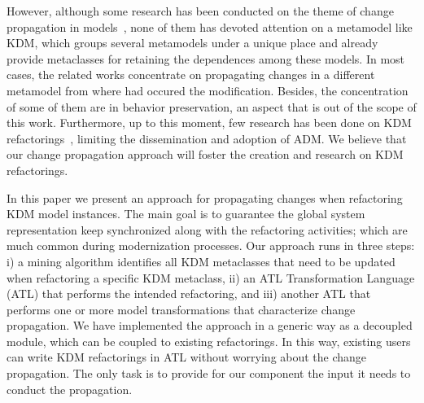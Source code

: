 However, although some research has been conducted on the theme of change propagation in models~\cite{4440135, Mens:2006:TMT:1706639.1706924, Mens:2006_NEW, Mens:2007, ICSOFT2014_Winetzhammer}, none of them has devoted attention on a metamodel like KDM, which groups several metamodels under a unique place and already provide metaclasses for retaining the dependences among these models. In most cases, the related works concentrate on propagating changes in a different metamodel from where had occured the modification. Besides, the concentration of some of them are in behavior preservation, an aspect that is out of the scope of this work. Furthermore, up to this moment, few research has been done on KDM refactorings~\cite{IRIDurelliCatalogo}, limiting the dissemination and adoption of ADM. We believe that our change propagation approach will foster the creation and research on KDM refactorings. 


In this paper we present an approach for propagating changes when refactoring KDM model instances. The main goal is to guarantee the global system representation keep synchronized along with the refactoring activities; which are much common during modernization processes. Our approach runs in three steps: i) a mining algorithm identifies all KDM metaclasses that need to be updated when refactoring a specific KDM metaclass, ii) an ATL Transformation Language (ATL) that performs the intended refactoring, and iii) another ATL that performs one or more model transformations that characterize change propagation. We have implemented the approach in a generic way as a decoupled module, which can be coupled to existing refactorings. In this way, existing users can write KDM refactorings in ATL without worrying about the change propagation. The only task is to provide for our component the input it needs to conduct the propagation.

